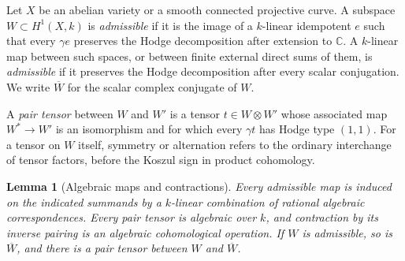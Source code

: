 \documentclass[11pt]{article}
\newcommand{\C}{\mathbb C}
\newtheorem{lemma}[theorem]{Lemma}
\numberwithin{equation}{section}
\begin{document}
Let $X$ be an abelian variety or a smooth connected projective curve.
A subspace $W\subset H^1(X,k)$ is \emph{admissible} if it is the
image of a $k$-linear idempotent $e$ such that every $\gamma e$
preserves the Hodge decomposition after extension to $\C$.
A $k$-linear map between such spaces, or between finite external
direct sums of them, is \emph{admissible} if it preserves the Hodge decomposition
after every scalar conjugation.  We write $\overline W$ for the
scalar complex conjugate of $W$.

A \emph{pair tensor} between $W$ and $W'$ is a tensor
$t\in W\otimes W'$ whose associated map $W^*\to W'$ is an
isomorphism and for which every $\gamma t$ has Hodge type $(1,1)$.
For a tensor on $W$ itself, symmetry or alternation refers to the
ordinary interchange of tensor factors, before the Koszul sign in
product cohomology.

\begin{lemma}[Algebraic maps and contractions]
\label{p3:admissible-operations}
Every admissible map is induced on the indicated summands by a
$k$-linear combination of rational algebraic correspondences.
Every pair tensor is algebraic over $k$, and contraction by its
inverse pairing is an algebraic cohomological operation.
If $W$ is admissible, so is $\overline W$, and there is a pair
tensor between $W$ and $\overline W$.
\end{lemma}
\end{document}
